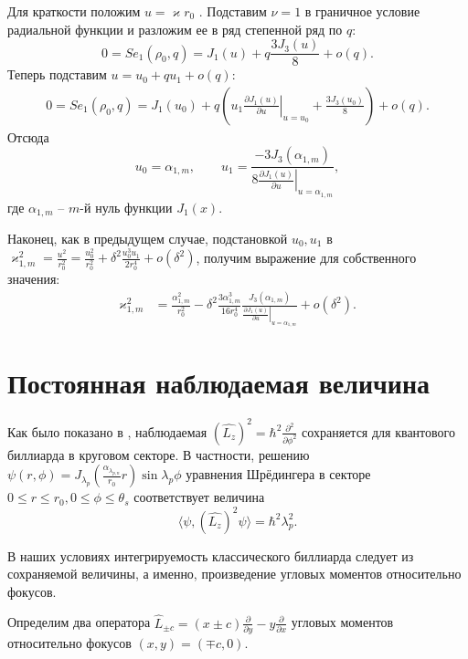 Для краткости положим $u = \varkappa r_0$ .
Подставим $\nu = 1$ в граничное условие радиальной функции и разложим ее в ряд степенной ряд по $q$:
\begin{equation*}
    0 = Se_1(\rho_0, q) = 
    J_1(u) + q  \frac{3 J_3(u)}{8} + o(q).
\end{equation*}
Теперь подставим $u = u_0 + q u_1 + o(q)$:
\begin{align*}
    0 = Se_1(\rho_0, q) =    J_1(u_0) + q \left( 
    u_1 \left.\frac{\partial J_1 (u)}{\partial u}\right|_{u=u_0}
    + \frac{3 J_3(u_0)}{8}
    \right) + o(q).
\end{align*}
Отсюда 
\begin{equation*}
u_0 = \alpha_{1, m}, \qquad u_1 = 
\frac{ - 3 J_3(\alpha_{1, m}) }{8\left.
\frac{\partial J_1 (u)}{\partial u}\right|_{u=\alpha_{1, m}}},
\end{equation*}
где $\alpha_{1, m}$ -- $m$-й нуль функции $J_1(x)$. 

Наконец, как в предыдущем случае, подстановкой $u_0, u_1$ в $\varkappa_{1, m}^2 = \frac{u^2}{r_0^2} = \frac{u_0^2}{r_0^2} + \delta^2 \frac{u_0^3 u_1}{2r_0^4} + o(\delta^2)$, получим выражение для собственного значения:
\begin{align}
    \varkappa_{1, m}^2& = \frac{\alpha_{1, m}^2}{r_0^2} - \delta^2 \frac{3\alpha_{1, m}^3}{16r_0^4} 
    \frac{J_3(\alpha_{1, m})}{\left.\frac{\partial J_1 (u)}{\partial u}\right|_{u=\alpha_{1, m}}} 
    + o(\delta^2).  \label{eq:valS2}
\end{align}

\section{Постоянная наблюдаемая величина}\label{sec:ch2/sec3}

Как было показано в  \cite{wref13}, наблюдаемая  $(\hat{L_z})^2=\hbar^2\frac{\partial^2}{\partial \phi^2}$ сохраняется для квантового биллиарда в круговом секторе. 
В частности, решению $\psi(r,\phi) = J_{\lambda_p}(\frac{\alpha_{\lambda_{p,n}}}{r_0}r) \sin \lambda_p \phi$ 
уравнения Шрёдингера в секторе $0\leq r \leq r_0, 0 \leq \phi \leq \theta_s$ соответствует величина $$\langle \psi, (\hat{L_z})^2\psi\rangle = \hbar^2 \lambda_p^2.$$

В наших условиях интегрируемость классического биллиарда следует из сохраняемой величины, а именно, произведение угловых моментов относительно фокусов.


Определим два оператора  $\hat L_{\pm c} = (x \pm c)\frac{\partial}{\partial y} - y\frac{\partial}{\partial x}$ угловых моментов относительно фокусов  $(x,y) = (\mp c, 0)$.


